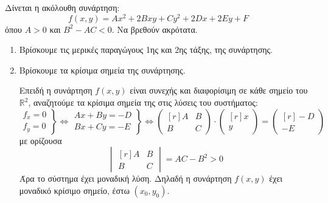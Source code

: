 \documentclass[a4paper,table]{report}
\begin{document}
\begin{mybox3}
  \begin{thema}
    Δίνεται η ακόλουθη συνάρτηση: 
    \[
      f(x,y) = Ax^{2}+2Bxy+Cy^2+2Dx+2Ey+F 
    \] 
    όπου $ A>0 $ και $ B^{2}-AC <0 $. Να βρεθούν ακρότατα.
  \end{thema}
\end{mybox3}
\begin{solution}
  \item {}
  \begin{enumerate}
    \item Βρίσκουμε τις μερικές παραγώγους 1ης και 2ης τάξης, της συνάρτησης.

      \vspace{0.5\baselineskip}
    \item Βρίσκουμε τα κρίσιμα σημεία της συνάρτησης.

      Επειδή η συνάρτηση $ f(x,y) $ είναι συνεχής και διαφορίσιμη σε κάθε σημείο 
      του $ \mathbb{R}^{2} $, αναζητούμε τα κρίσιμα σημεία της στις λύσεις του
      συστήματος:
      \[
        \left.
          \begin{matrix}
            f_{x}=0 \\
            f_{y}=0
          \end{matrix} 
        \right\} \Leftrightarrow 
        \left.
          \begin{matrix}
            Ax+By=-D \\
            Bx+Cy=-E
          \end{matrix} 
        \right\} \Leftrightarrow 
        \begin{pmatrix*}[r] A & B \\ B & C \end{pmatrix*} \cdot 
        \begin{pmatrix*}[r] x \\ y \end{pmatrix*} = 
        \begin{pmatrix*}[r] -D \\ -E \end{pmatrix*}
      \] 
      με ορίζουσα 
      \[
        \begin{vmatrix*}[r]
          A & B \\
          B & C
        \end{vmatrix*} = AC-B^{2}>0
      \] 
      Άρα το σύστημα έχει μοναδική λύση. Δηλαδή η συνάρτηση $ f(x,y) $ έχει μοναδικό 
      κρίσιμο σημείο, έστω $ (x_{0}, y_{0}) $.


\end{enumerate}
\end{solution}
\end{document}

